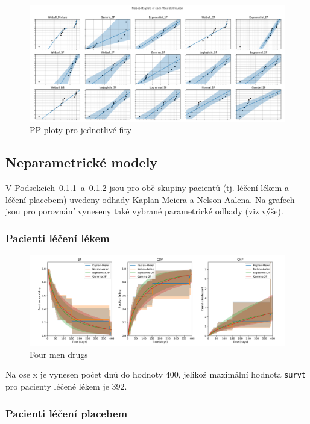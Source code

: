 \documentclass[a4, 11pt]{article}
\theoremstyle{definition}
\theoremstyle{remark}
\begin{document}
	\begin{figure}[H]
		\centering
		\includegraphics[width=0.9\linewidth]{img/fiteverything_placebo_PP_plots.png}
		\caption{PP ploty pro jednotlivé fity}
		\label{fig:fit_everything_placebo_PP_plots}
	\end{figure}
	
	\subsection{Neparametrické modely} \label{sec:non_parametric_all}
	V Podsekcích~\ref{sec:non_parametric_drugs}~a~\ref{sec:non_parametric_placebo} jsou pro obě skupiny pacientů (tj. léčení lékem a léčení placebem) uvedeny odhady Kaplan-Meiera a Nelson-Aalena.
	Na grafech jsou pro porovnání vyneseny také vybrané parametrické odhady (viz výše).
	
	\subsubsection{Pacienti léčení lékem} \label{sec:non_parametric_drugs}
	
	\begin{figure}[H]
		\centering
		\includegraphics[width=0.9\linewidth]{img/four_men_drugs.png}
		\caption{Four men drugs}
		\label{fig:four_men_drugs}
	\end{figure}

	Na ose x je vynesen počet dnů do hodnoty 400, jelikož maximální hodnota \texttt{survt} pro pacienty léčené lékem je 392.
	
	\subsubsection{Pacienti léčení placebem} \label{sec:non_parametric_placebo}
	
\end{document}
